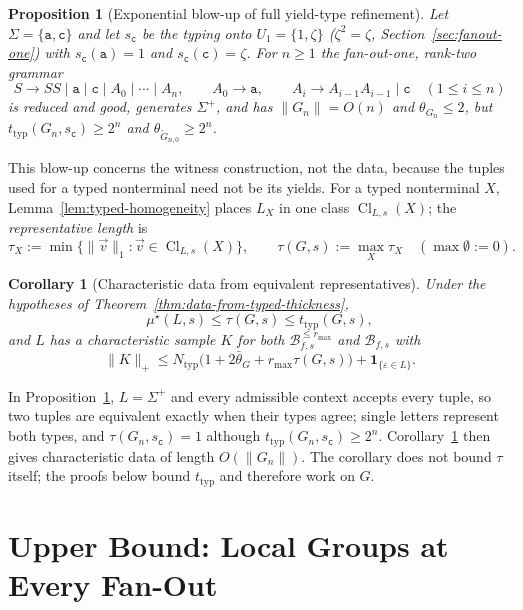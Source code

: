 \documentclass[11pt]{article}
\numberwithin{equation}{section}
\theoremstyle{plain}
\newtheorem{proposition}[theorem]{Proposition}
\newtheorem{corollary}[theorem]{Corollary}
\theoremstyle{definition}
\theoremstyle{remark}
\newcommand{\tuple}[1]{\vec{#1}}
\newcommand{\eps}{\varepsilon}
\theoremstyle{plain}
\begin{document}
\begin{proposition}[Exponential blow-up of full yield-type refinement]
\label{prop:typed-thickness-exponential}
Let $\Sigma=\{\mathtt a,\mathtt c\}$ and let $s_{\mathtt c}$ be the typing onto
$U_1=\{1,\zeta\}$ ($\zeta^2=\zeta$, Section~\ref{sec:fanout-one}) with $s_{\mathtt c}(\mathtt a)=1$ and
$s_{\mathtt c}(\mathtt c)=\zeta$.  For $n\ge1$ the fan-out-one, rank-two grammar
\[
 S\to SS\mid\mathtt a\mid\mathtt c\mid A_0\mid\cdots\mid A_n,\qquad
 A_0\to\mathtt a,\qquad
 A_i\to A_{i-1}A_{i-1}\mid\mathtt c\quad(1\le i\le n)
\]
is reduced and good, generates $\Sigma^+$, and has $\|G_n\|=O(n)$ and
$\theta_{G_n}\le2$, but $t_{\mathrm{typ}}(G_n,s_{\mathtt c})\ge2^n$ and
$\theta_{\widetilde G_{n,0}}\ge2^n$.
\end{proposition}

This blow-up concerns the witness construction, not the data, because the
tuples used for a typed nonterminal need not be its yields.  For a typed
nonterminal $X$, Lemma~\ref{lem:typed-homogeneity} places $L_X$ in one class
$\operatorname{Cl}_{L,s}(X)$; the \emph{representative length} is
\[
 \tau_X:=\min\{\|\tuple v\|_1:\tuple v\in\operatorname{Cl}_{L,s}(X)\},\qquad
 \tau(G,s):=\max_X\tau_X\quad(\max\emptyset:=0).
\]

\begin{corollary}[Characteristic data from equivalent representatives]
\label{cor:distribution-representatives}
Under the hypotheses of Theorem~\ref{thm:data-from-typed-thickness},
\[
 \mu^\star(L,s)\le\tau(G,s)\le t_{\mathrm{typ}}(G,s),
\]
and $L$ has a characteristic sample $K$ for both
$\mathcal B^{\le r_{\max}}_{f,s}$ and $\mathcal B_{f,s}$ with
\[
 \|K\|_+\le N_{\mathrm{typ}}\bigl(1+2\bar\theta_G+r_{\max}\tau(G,s)\bigr)
 +\mathbf 1_{\{\eps\in L\}}.
\]
\end{corollary}

In Proposition~\ref{prop:typed-thickness-exponential}, $L=\Sigma^+$ and every
admissible context accepts every tuple, so two tuples are equivalent exactly
when their types agree; single letters represent both types, and
$\tau(G_n,s_{\mathtt c})=1$ although $t_{\mathrm{typ}}(G_n,s_{\mathtt c})\ge2^n$.
Corollary~\ref{cor:distribution-representatives} then gives characteristic
data of length $O(\|G_n\|)$.  The corollary does not bound $\tau$ itself; the
proofs below bound $t_{\mathrm{typ}}$ and therefore work on $G$.

\section{Upper Bound: Local Groups at Every Fan-Out}
\label{sec:upper}
\end{document}
